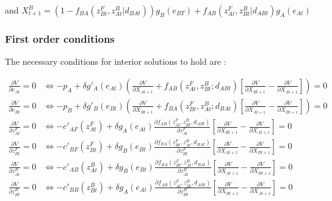 \documentclass{article}
\begin{document}
and $X_{t+1}^B =(1 - f_{BA}(z^F_{Bt}, z^B_{At}| d_{BAt}))g_B(e_{BT}) +f_{AB}(z^F_{At}, z^B_{Bt}| d_{ABt})g_A(e_{At})$

\subsubsection{First order conditions}
The necessary conditions for interior solutions to hold are :

\begin{align}
\frac{\partial V}{\partial e_{At}} =  0 &\iff - p_A + \delta g'_A(e_{At})\left( \frac{\partial V}{\partial X_{At+1}} + f_{AB}(z_{At}^F, z_{Bt}^B; d_{ABt})\left[\frac{\partial V}{\partial X_{Bt+1}} - \frac{\partial V}{\partial X_{At+1}} \right] \right)=0 \label{eq:foc_eat}\\
%
\frac{\partial V}{\partial e_{Bt}} =  0 &\iff - p_B + \delta g'_B(e_{Bt})\left( \frac{\partial V}{\partial X_{Bt+1}} + f_{BA}(z_{Bt}^F, z_{At}^B; d_{BAt})\left[\frac{\partial V}{\partial X_{At+1}} - \frac{\partial V}{\partial X_{Bt+1}} \right] \right) = 0 \label{eq:foc_ebt}\\
%
\frac{\partial V}{\partial z^F_{At}} = 0 &\iff -c'_{AF}(z_{At}^F) + \delta g_A(e_{At}) \frac{\partial f_{AB}(z_{At}^F, z_{Bt}^B, d_{ABt})}{\partial z_{At}^F} \left[\frac{\partial V}{\partial X_{Bt+1}} - \frac{\partial V}{\partial X_{At+1}}  \right] = 0\label{eq:foc_zfa}\\
%
\frac{\partial V}{\partial z^F_{Bt}} = 0 &\iff -c'_{BF}(z_{Bt}^F) + \delta g_B(e_{Bt}) \frac{\partial f_{BA}(z_{Bt}^F, z_{At}^B, d_{BAt})}{\partial z_{Bt}^F} \left[\frac{\partial V}{\partial X_{At+1}} - \frac{\partial V}{\partial X_{Bt+1}}  \right] = 0\label{eq:foc_zfb}\\
%
\frac{\partial V}{\partial z_{At}^B} = 0 &\iff - c'_{AB}(z_{At}^B) + \delta g_B(e_{Bt}) \frac{\partial f_{BA}(z_{Bt}^F, z_{At}^B, d_{BAt})}{\partial z_{At}^B} \left[ \frac{\partial V}{\partial X_{At+1}} - \frac{\partial V}{\partial X_{Bt+1}}\right] = 0 \label{eq:foc_zba}\\
%
\frac{\partial V}{\partial z_{Bt}^B} = 0 &\iff - c'_{BB}(z_{Bt}^B) + \delta g_A(e_{At}) \frac{\partial f_{AB}(z_{At}^F, z_{Bt}^B, d_{ABt})}{\partial z_{Bt}^B} \left[ \frac{\partial V}{\partial X_{Bt+1}} - \frac{\partial V}{\partial X_{At+1}}\right] = 0
\label{eq:foc_zbb}
\end{align}
\end{document}
